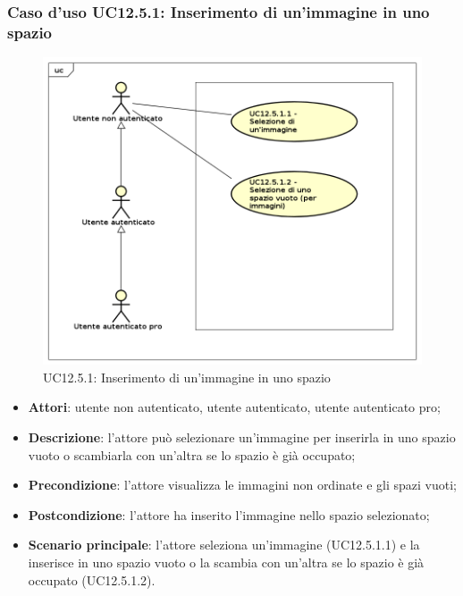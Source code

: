 \subsubsection{Caso d'uso UC12.5.1: Inserimento di un'immagine in uno spazio}
\label{UC12.5.1}
\begin{figure}[h]
	\centering
	\includegraphics[scale=0.5]{UML/UC12_5_1.png}
	\caption{UC12.5.1: Inserimento di un'immagine in uno spazio}
\end{figure}
\begin{itemize}
\item \textbf{Attori}: utente non autenticato, utente autenticato, utente autenticato pro;
\item \textbf{Descrizione}: l'attore può selezionare un'immagine per inserirla in uno spazio vuoto o scambiarla con un'altra se lo spazio è già occupato;
\item \textbf{Precondizione}: l'attore visualizza le immagini non ordinate e gli spazi vuoti;
\item \textbf{Postcondizione}: l'attore ha inserito l'immagine nello spazio selezionato;
\item \textbf{Scenario principale}: l'attore seleziona un'immagine (UC12.5.1.1) e la inserisce in uno spazio vuoto o la scambia con un'altra se lo spazio è già occupato (UC12.5.1.2).
\end{itemize}

